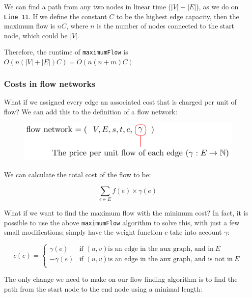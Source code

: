 We can find a path from any two nodes in linear time ($|V| + |E|$), as we do on
\texttt{Line 11}. If we define the constant $C$ to be the highest edge capacity,
then the maximum flow is $nC$, where $n$ is the number of nodes connected to the
start node, which could be $|V|$.

Therefore, the runtime of \texttt{maximumFlow} is $O(n(|V| + |E|)C) =
O(n(n+m)C)$

\subsubsection{Costs in flow networks}

What if we assigned every edge an associated cost that is charged per unit of
flow? We can add this to the definition of a flow network:

\begin{figure}[H]
  \centering
  \includegraphics{equations/flow-network-costs}
  \label{fig:flow-network-definition-costs}
\end{figure}


We can calculate the total cost of the flow to be:

\[
  \sum_{e \in E} f(e) \times \gamma(e)
\]

What if we want to find the maximum flow with the minimum cost? In fact, it is
possible to use the above \texttt{maximumFlow} algorithm to solve this, with
just a few small modifications; simply have the weight function $c$ take into
account $\gamma$:

\[
    c(e) = 
    \begin{cases}
        \gamma(e) & \text{if } (u,v) \text{is an edge in the aux graph, and in}
          ~E\\
        -\gamma(e) & \text{if } (u,v) \text{is an edge in the aux graph, and is
          not in}~E\\
    \end{cases}
\]

The only change we need to make on our flow finding algorithm is to find the
path from the start node to the end node using a minimal length:

